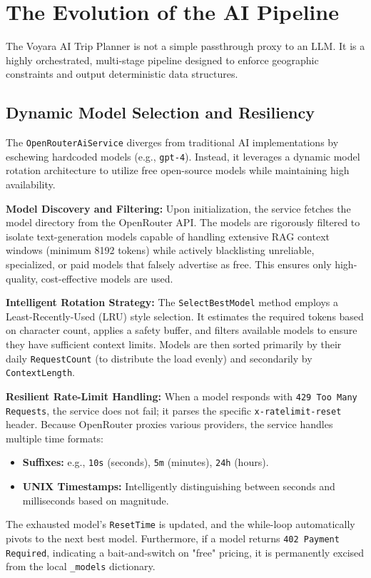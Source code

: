 \section{The Evolution of the AI Pipeline}
The Voyara AI Trip Planner is not a simple passthrough proxy to an LLM. It is a highly orchestrated, multi-stage pipeline designed to enforce geographic constraints and output deterministic data structures.

\subsection{Dynamic Model Selection and Resiliency}
The \texttt{OpenRouterAiService} diverges from traditional AI implementations by eschewing hardcoded models (e.g., \texttt{gpt-4}). Instead, it leverages a dynamic model rotation architecture to utilize free open-source models while maintaining high availability.

\textbf{Model Discovery and Filtering:}
Upon initialization, the service fetches the model directory from the OpenRouter API. The models are rigorously filtered to isolate text-generation models capable of handling extensive RAG context windows (minimum 8192 tokens) while actively blacklisting unreliable, specialized, or paid models that falsely advertise as free. This ensures only high-quality, cost-effective models are used.

\textbf{Intelligent Rotation Strategy:}
The \texttt{SelectBestModel} method employs a Least-Recently-Used (LRU) style selection. It estimates the required tokens based on character count, applies a safety buffer, and filters available models to ensure they have sufficient context limits. Models are then sorted primarily by their daily \texttt{RequestCount} (to distribute the load evenly) and secondarily by \texttt{ContextLength}.

\textbf{Resilient Rate-Limit Handling:}
When a model responds with \texttt{429 Too Many Requests}, the service does not fail; it parses the specific \texttt{x-ratelimit-reset} header. Because OpenRouter proxies various providers, the service handles multiple time formats:
\begin{itemize}
    \item \textbf{Suffixes:} e.g., \texttt{10s} (seconds), \texttt{5m} (minutes), \texttt{24h} (hours).
    \item \textbf{UNIX Timestamps:} Intelligently distinguishing between seconds and milliseconds based on magnitude.
\end{itemize}
The exhausted model's \texttt{ResetTime} is updated, and the while-loop automatically pivots to the next best model. Furthermore, if a model returns \texttt{402 Payment Required}, indicating a bait-and-switch on "free" pricing, it is permanently excised from the local \texttt{\_models} dictionary.

